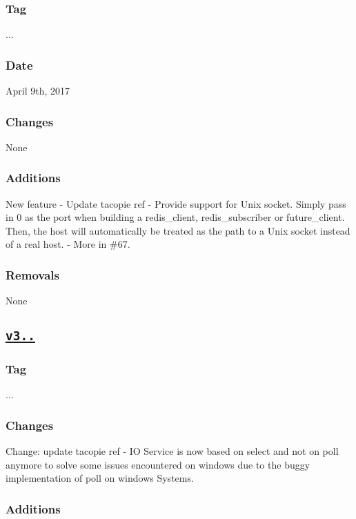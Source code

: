 \subsubsection*{Tag}

{..}. \subsubsection*{Date}

April 9th, 2017 \subsubsection*{Changes}

None \subsubsection*{Additions}


\begin{DoxyItemize}
\item New feature -\/ Update tacopie ref -\/ Provide support for Unix socket. Simply pass in 0 as the port when building a {\ttfamily redis\+\_\+client}, {\ttfamily redis\+\_\+subscriber} or {\ttfamily future\+\_\+client}. Then, the host will automatically be treated as the path to a Unix socket instead of a real host. -\/ More in \#67. \subsubsection*{Removals}
\end{DoxyItemize}

None

\subsection*{\href{https://github.com/Cylix/cpp_redis/releases/tag/3.4.0}{\tt v3..}}

\subsubsection*{Tag}

{..}. \subsubsection*{Changes}


\begin{DoxyItemize}
\item Change\+: update tacopie ref -\/ IO Service is now based on {\ttfamily select} and not on {\ttfamily poll} anymore to solve some issues encountered on windows due to the buggy implementation of {\ttfamily poll} on windows Systems. \subsubsection*{Additions}
\end{DoxyItemize}

